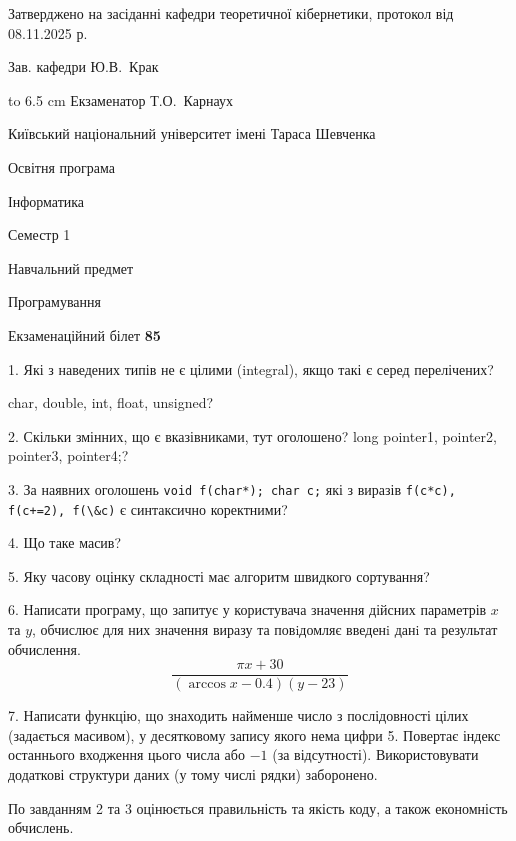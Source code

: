 \documentclass[12pt, ukrainian]{article}
\def\code#1{\Verb!#1!}
\begin{document}
{\smallskip\smallskip \begin {scriptsize} Затверджено на засіданні кафедри теоретичної кібернетики, протокол   від   08.11.2025 р.\par\smallskip\smallskip\smallskip\smallskip
{\parbox {6.5 cm} {Зав. кафедри \dotfill Ю.В.~Крак}}\hspace {0.7cm} {\hbox to 6.5 cm { Екзаменатор \dotfill Т.О.~Карнаух}} \end{scriptsize}}
\newpage
{{\begin {scriptsize}\par
{ \center  Київський національний університет імені Тараса Шевченка \par}
{\parbox {5 cm}{Освітня програма \hfill}{\parbox {7 cm}{Інформатика\hfill}}\parbox {6 cm}{\hfill Семестр 1}}\par
{\parbox {5 cm} {Навчальний предмет \hfill}\parbox {7 cm}{Програмування \hfill}\parbox {6cm}{\hfill}\par}\vspace{-15pt} \end{scriptsize}}{\center Екзаменаційний білет \No \textbf { 85 }\par}}
{%
1. Які з наведених типів не є цілими (integral), якщо такі є серед перелічених?

char, double, int, float, unsigned?
\par
\vspace{2mm}
2. Скільки змінних, що є вказівниками, тут оголошено?
long pointer1, pointer2, pointer3, pointer4;?
\par
\vspace{2mm}
3. За наявних оголошень \code{void f(char*); char c;} які з виразів \code{f(c*c), f(c+=2), f(\&c)} є синтаксично коректними?
\par
\vspace{2mm}
4. Що таке масив?
\par
\vspace{2mm}
5. Яку часову оцінку складності має алгоритм швидкого сортування?
\par
\vspace{2mm}
6. Написати програму, що запитує у користувача значення дійсних параметрів $x$ та $y$, обчислює для них значення виразу та повiдомляє введенi данi та результат обчислення.
$$\frac{\pi x + 30}{(\arccos x - 0.4) (y - 23)}$$ 

\par
7. Написати функцію, що знаходить найменше число з послідовності цілих (задається масивом), у десятковому запису якого нема цифри 5. Повертає індекс останнього входження цього числа або $-1$ (за відсутності). Використовувати додаткові структури даних (у тому числі рядки) заборонено.

По завданням 2 та 3 оцінюється правильність та якість коду, а також економність обчислень.

}
\end{document}

